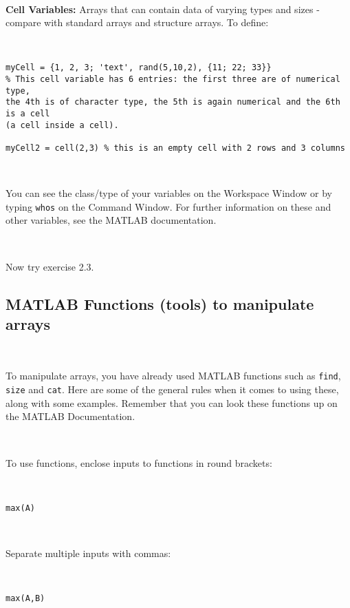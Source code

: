 \documentclass[11pt]{amsart}
\begin{document}
\
 
{\bf Cell Variables:} Arrays that can contain data of varying types and sizes - compare with  standard arrays and structure arrays. To define:

\

\color{blue}
\begin{verbatim}
myCell = {1, 2, 3; 'text', rand(5,10,2), {11; 22; 33}}
% This cell variable has 6 entries: the first three are of numerical type, 
the 4th is of character type, the 5th is again numerical and the 6th is a cell 
(a cell inside a cell).

myCell2 = cell(2,3) % this is an empty cell with 2 rows and 3 columns
\end{verbatim}
\color{black}

\    
          
You can see the class/type of your variables on the Workspace Window or by typing \verb+whos+ on the Command Window. For further information on these and other variables, see the MATLAB documentation.

\

Now try exercise 2.3.

\subsection{MATLAB Functions (tools) to manipulate arrays}

\

To manipulate arrays, you have already used MATLAB functions such as \verb+find+, \verb+size+ and \verb+cat+. Here are some of the general rules when it comes to using these, along with some examples. Remember that you can look these functions up on the MATLAB Documentation. 

\

To use functions, enclose inputs to functions in round brackets:

\

\color{blue}
\begin{verbatim}
max(A)
\end{verbatim}
\color{black}

\

Separate multiple inputs with commas:  

\

\color{blue}
\begin{verbatim}
max(A,B)
 \end{verbatim}
\color{black}

\
\end{document}
